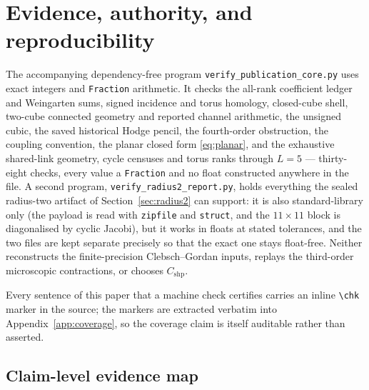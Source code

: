 \documentclass[11pt]{article}
\theoremstyle{plain}
\theoremstyle{definition}
\theoremstyle{remark}
\begin{document}
\section{Evidence, authority, and reproducibility}
\label{sec:repro}

The accompanying dependency-free program
\texttt{verify\_publication\_core.py} uses exact integers and
\texttt{Fraction} arithmetic. It checks the all-rank coefficient ledger and
Weingarten sums, signed incidence and torus homology, closed-cube shell,
two-cube connected geometry and reported channel arithmetic, the unsigned
cubic, the saved historical Hodge pencil, the fourth-order obstruction, the
coupling convention, the planar closed form \eqref{eq:planar}, and the
exhaustive shared-link geometry, cycle censuses and torus ranks through
$L=5$ --- thirty-eight checks, every value
a \texttt{Fraction} and no float constructed anywhere in the file. A second
program, \texttt{verify\_radius2\_report.py}, holds everything the sealed
radius-two artifact of Section~\ref{sec:radius2} can support: it is also
standard-library only (the payload is read with \texttt{zipfile} and
\texttt{struct}, and the $11\times11$ block is diagonalised by cyclic
Jacobi), but it works in floats at stated tolerances, and the two files are
kept separate precisely so that the exact one stays float-free. Neither
reconstructs the finite-precision Clebsch--Gordan inputs, replays the
third-order microscopic contractions, or chooses $C_{\mathrm{shp}}$.

Every sentence of this paper that a machine check certifies carries an
inline \texttt{\textbackslash chk} marker in the source; the markers are
extracted verbatim into Appendix~\ref{app:coverage}, so the coverage claim
is itself auditable rather than asserted.

\subsection{Claim-level evidence map}
\end{document}
